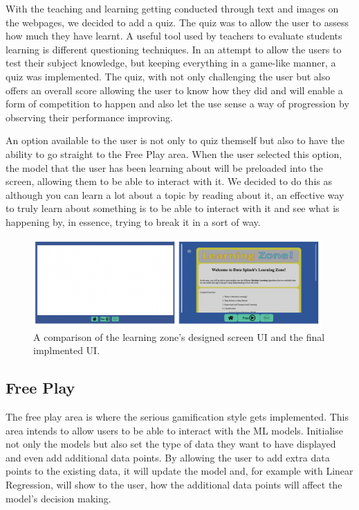 	With the teaching and learning getting conducted through text and images on the webpages, we decided to add a quiz. The quiz was to allow the user to assess how much they have learnt. A useful tool used by teachers to evaluate students learning is different questioning techniques. In an attempt to allow the users to test their subject knowledge, but keeping everything in a game-like manner, a quiz was implemented. The quiz, with not only challenging the user but also offers an overall score allowing the user to know how they did and will enable a form of competition to happen and also let the use sense a way of progression by observing their performance improving.
	
	An option available to the user is not only to quiz themself but also to have the ability to go straight to the Free Play area. When the user selected this option, the model that the user has been learning about will be preloaded into the screen, allowing them to be able to interact with it. We decided to do this as although you can learn a lot about a topic by reading about it, an effective way to truly learn about something is to be able to interact with it and see what is happening by, in essence, trying to break it in a sort of way.
	
	\begin{figure}[t]
		\begin{center}
			\includegraphics[width=11cm]{graphics/learning_zone.png}
			\caption{A comparison of the learning zone's designed screen UI and the final implmented UI.}
			\label{fig:ui_lz}
		\end{center}
	\end{figure}
	
	\subsection{Free Play}
	
	The free play area is where the serious gamification style gets implemented. This area intends to allow users to be able to interact with the ML models. Initialise not only the models but also set the type of data they want to have displayed and even add additional data points. By allowing the user to add extra data points to the existing data, it will update the model and, for example with Linear Regression, will show to the user, how the additional data points will affect the model's decision making.
	
